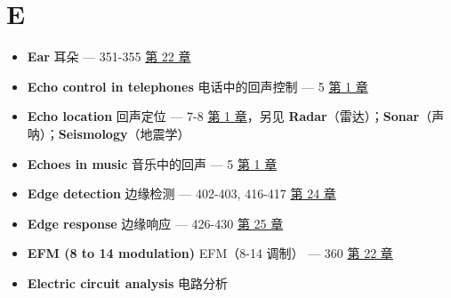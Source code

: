 \section{E}

\begin{itemize}
\tightlist
\item
  \textbf{Ear} 耳朵 --- 351-355  \hyperref[ch-22]{第 22 章}
\item
  \textbf{Echo control in telephones} 电话中的回声控制 --- 5 
  \hyperref[ch-01]{第 1 章}
\item
  \textbf{Echo location} 回声定位 --- 7-8  \hyperref[ch-01]{第
  1 章}，另见
  \textbf{Radar}（雷达）；\textbf{Sonar}（声呐）；\textbf{Seismology}（地震学）
\item
  \textbf{Echoes in music} 音乐中的回声 --- 5 
  \hyperref[ch-01]{第 1 章}
\item
  \textbf{Edge detection} 边缘检测 --- 402-403, 416-417 
  \hyperref[ch-24]{第 24 章}
\item
  \textbf{Edge response} 边缘响应 --- 426-430 
  \hyperref[ch-25]{第 25 章}
\item
  \textbf{EFM (8 to 14 modulation)} EFM（8-14 调制） --- 360 
  \hyperref[ch-22]{第 22 章}
\item
  \textbf{Electric circuit analysis} 电路分析


\end{itemize}
